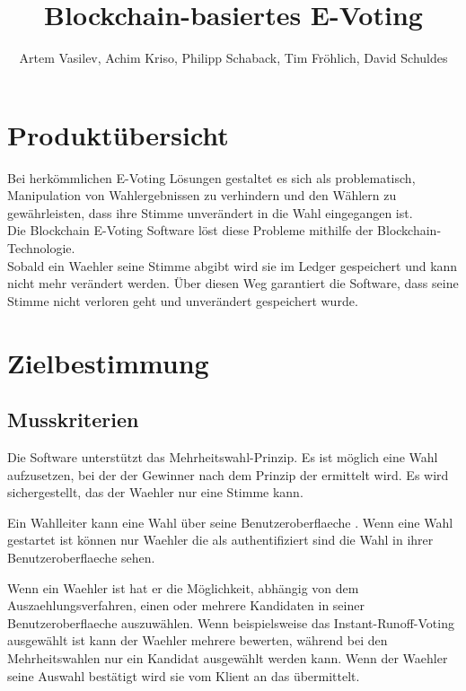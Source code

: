 \documentclass[parskip=full,11pt,twoside]{scrartcl}
\title{Blockchain-basiertes E-Voting}
\author{Artem Vasilev, Achim Kriso, Philipp Schaback, Tim Fröhlich, David Schuldes}
\begin{document}
\maketitle

\pagebreak

\tableofcontents
\pagebreak
\section{Produktübersicht}

Bei herkömmlichen E-Voting Lösungen gestaltet es sich als problematisch, Manipulation von Wahlergebnissen zu verhindern und den Wählern zu gewährleisten, dass ihre Stimme unverändert in die Wahl eingegangen ist. \\
Die Blockchain E-Voting Software löst diese Probleme mithilfe der Blockchain-Technologie. \\
Sobald ein \gls{Waehler} seine \gls{Stimme} abgibt wird sie im \gls{Ledger} gespeichert und kann nicht mehr verändert werden. Über diesen Weg garantiert die Software, dass seine \gls{Stimme} nicht verloren geht und unverändert gespeichert wurde.

\section{Zielbestimmung}

\subsection{Musskriterien}

Die Software unterstützt das Mehrheitswahl-Prinzip. Es ist möglich eine \gls{Wahl} aufzusetzen, bei der der Gewinner nach dem Prinzip der 
 ermittelt wird. 
Es wird sichergestellt, das der \gls{Waehler} nur eine Stimme  kann.

Ein \gls{Wahlleiter} kann eine \gls{Wahl} über seine \gls{Benutzeroberflaeche} .
Wenn eine \gls{Wahl} gestartet ist können nur \gls{Waehler} die als  authentifiziert sind die \gls{Wahl} in ihrer \gls{Benutzeroberflaeche} sehen.

Wenn ein \gls{Waehler}  ist hat er die Möglichkeit, abhängig von dem \gls{Auszaehlungsverfahren}, einen oder mehrere Kandidaten in seiner \gls{Benutzeroberflaeche} auszuwählen. Wenn beispielsweise das \gls{Instant-Runoff-Voting} ausgewählt ist kann der \gls{Waehler} mehrere  bewerten, während bei den Mehrheitswahlen nur ein \gls{Kandidat} ausgewählt werden kann.
Wenn der \gls{Waehler} seine Auswahl bestätigt wird sie vom \gls{Klient} an das  übermittelt.
\end{document}
